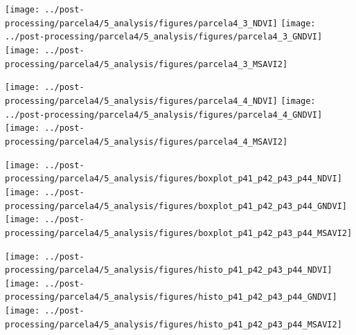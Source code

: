\documentclass[spanish,openany]{article}
\begin{document}
\texttt{[image: ../post-processing/parcela4/5\_analysis/figures/parcela4\_3\_NDVI]}
\texttt{[image: ../post-processing/parcela4/5\_analysis/figures/parcela4\_3\_GNDVI]}
\texttt{[image: ../post-processing/parcela4/5\_analysis/figures/parcela4\_3\_MSAVI2]}

\texttt{[image: ../post-processing/parcela4/5\_analysis/figures/parcela4\_4\_NDVI]}
\texttt{[image: ../post-processing/parcela4/5\_analysis/figures/parcela4\_4\_GNDVI]}
\texttt{[image: ../post-processing/parcela4/5\_analysis/figures/parcela4\_4\_MSAVI2]}

\texttt{[image: ../post-processing/parcela4/5\_analysis/figures/boxplot\_p41\_p42\_p43\_p44\_NDVI]}
\texttt{[image: ../post-processing/parcela4/5\_analysis/figures/boxplot\_p41\_p42\_p43\_p44\_GNDVI]}
\texttt{[image: ../post-processing/parcela4/5\_analysis/figures/boxplot\_p41\_p42\_p43\_p44\_MSAVI2]}

\texttt{[image: ../post-processing/parcela4/5\_analysis/figures/histo\_p41\_p42\_p43\_p44\_NDVI]}
\texttt{[image: ../post-processing/parcela4/5\_analysis/figures/histo\_p41\_p42\_p43\_p44\_GNDVI]}
\texttt{[image: ../post-processing/parcela4/5\_analysis/figures/histo\_p41\_p42\_p43\_p44\_MSAVI2]}


\end{document}
